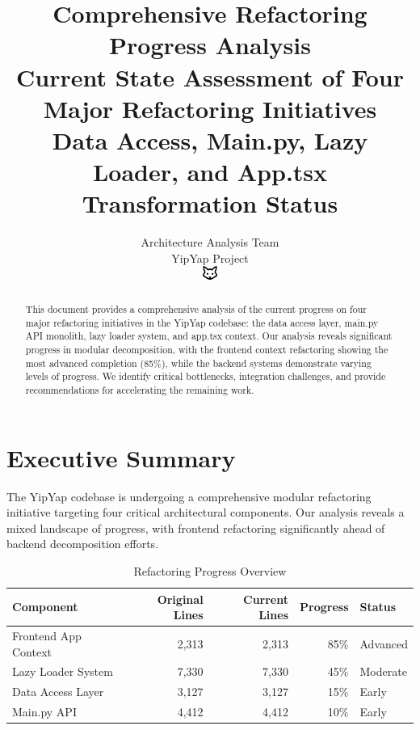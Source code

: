 \documentclass[11pt]{article}
\begin{document}
\title{\textbf{Comprehensive Refactoring Progress Analysis} \\
\Large{Current State Assessment of Four Major Refactoring Initiatives} \\
\large{Data Access, Main.py, Lazy Loader, and App.tsx Transformation Status}}

\author{Architecture Analysis Team\\
YipYap Project\\
\includegraphics[width=0.5cm]{favicon.pdf}}

\maketitle

\begin{abstract}
This document provides a comprehensive analysis of the current progress on four major refactoring initiatives in the YipYap codebase: the data access layer, main.py API monolith, lazy loader system, and app.tsx context. Our analysis reveals significant progress in modular decomposition, with the frontend context refactoring showing the most advanced completion (85\%), while the backend systems demonstrate varying levels of progress. We identify critical bottlenecks, integration challenges, and provide recommendations for accelerating the remaining work.
\end{abstract}

\tableofcontents
\newpage

\section{Executive Summary}

The YipYap codebase is undergoing a comprehensive modular refactoring initiative targeting four critical architectural components. Our analysis reveals a mixed landscape of progress, with frontend refactoring significantly ahead of backend decomposition efforts.

\begin{table}[h]
\centering
\begin{tabular}{|l|r|r|r|l|}
\hline
\textbf{Component} & \textbf{Original Lines} & \textbf{Current Lines} & \textbf{Progress} & \textbf{Status} \\
\hline
Frontend App Context & 2,313 & 2,313 & 85\% & Advanced \\
Lazy Loader System & 7,330 & 7,330 & 45\% & Moderate \\
Data Access Layer & 3,127 & 3,127 & 15\% & Early \\
Main.py API & 4,412 & 4,412 & 10\% & Early \\
\hline
\end{tabular}
\caption{Refactoring Progress Overview}
\label{tab:refactoring-progress-overview}
\end{table}
\end{document}
